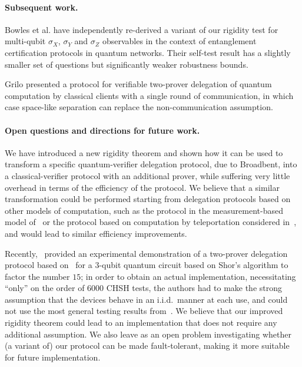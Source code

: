 \paragraph{Subsequent work.}
Bowles et al. \cite{BowlesSCA18}  have independently re-derived a
variant of our rigidity test for multi-qubit $\sigma_X$, $\sigma_Y$ and $\sigma_Z$ observables
in the context of entanglement certification protocols in
quantum networks.
Their self-test result has a slightly smaller set of questions but  significantly weaker robustness
bounds.

Grilo \cite{Grilo17} presented a protocol  for verifiable
two-prover delegation of quantum computation by classical clients with a single round of communication, in which case space-like
separation can replace the non-communication assumption.

\paragraph{Open questions and directions for future work.}
We have introduced a new rigidity theorem and shown how it can be used to transform a specific quantum-verifier delegation protocol, due to Broadbent, into a classical-verifier protocol with an additional prover, while suffering very little overhead in terms of the efficiency of the protocol. We believe that a similar transformation could be performed starting from delegation protocols based on other models of computation, such as the protocol in the measurement-based model of~\cite{fitzsimons12vubqc} or the protocol based on computation by teleportation considered in~\cite{reichardt2012classical}, and would lead to similar efficiency improvements. 

Recently,~\cite{experiment_ruv} provided an experimental demonstration of a
two-prover delegation protocol based on~\cite{reichardt2012classical} for a
$3$-qubit quantum circuit based on Shor's algorithm to factor the number $15$;
in order to obtain an actual implementation, necessitating ``only'' on the order
of $6000$ CHSH tests, the authors had to make the strong assumption that the
devices behave in an i.i.d.\ manner at each use, and could not use the most
general testing results from~\cite{reichardt2012classical}. We believe that our
improved rigidity theorem could lead to an implementation that does not require
any additional assumption. We also leave as an open problem investigating whether (a
variant of) our protocol can be made fault-tolerant, making it more suitable for
future implementation.


